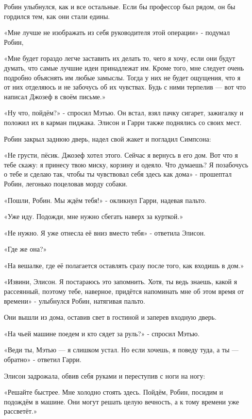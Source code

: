 \documentclass[a5paper, 9pt,
final, openany, twoside=true]{memoir}
\begin{document}
Робин улыбнулся, как и все остальные. Если бы профессор был рядом, он бы гордился тем, как они стали едины.

«Мне лучше не изображать из себя руководителя этой операции» - подумал Робин,

«Мне будет гораздо легче заставить их делать то, чего я хочу, если они будут думать, что самые лучшие идеи принадлежат им. Кроме того, мне следует очень подробно объяснять им любые замыслы. Тогда у них не будет ощущения, что я от них отделяюсь и не забочусь об их чувствах. Будь с ними терпелив — вот что написал Джозеф в своём письме.»

«Ну что, пойдём?» - спросил Мэтью. Он встал, взял пачку сигарет, зажигалку и положил их в карман пиджака. Элисон и Гарри также поднялись со своих мест.\bigskip

Робин закрыл заднюю дверь, надел свой жакет и погладил Симпсона:

«Не грусти, пёсик. Джозеф хотел этого. Сейчас я вернусь в его дом. Вот что я тебе скажу: я принесу твою миску, корзину и одеяло. Что думаешь? Я позабочусь о тебе и сделаю так, чтобы ты чувствовал себя здесь как дома» - прошептал Робин, легонько поцеловав морду собаки.

«Пошли, Робин. Мы ждём тебя!» - окликнул Гарри, надевая пальто.

«Уже иду. Подожди, мне нужно сбегать наверх за курткой.»

«Не нужно. Я уже отнесла её вниз вместо тебя» - ответила Элисон.

«Где же она?»

«На вешалке, где её полагается оставлять сразу после того, как входишь в дом.»

«Извини, Элисон. Я постараюсь это запомнить. Хотя, ты ведь знаешь, какой я рассеянный, поэтому тебе, наверное, придётся напоминать мне об этом время от времени» - улыбнулся Робин, натягивая пальто.

Они вышли из дома, оставив свет в гостиной и заперев входную дверь.

«На чьей машине поедем и кто сядет за руль?» - спросил Мэтью.

«Веди ты, Мэтью — я слишком устал. Но если хочешь, я поведу туда, а ты — обратно» - ответил Гарри.

Элисон задрожала, обвив себя руками и переступив с ноги на ногу:

«Решайте быстрее. Мне холодно стоять здесь. Пойдём, Робин, посидим и подождём в машине. Они могут решать целую вечность, а к тому времени уже рассветёт.»
\end{document}
